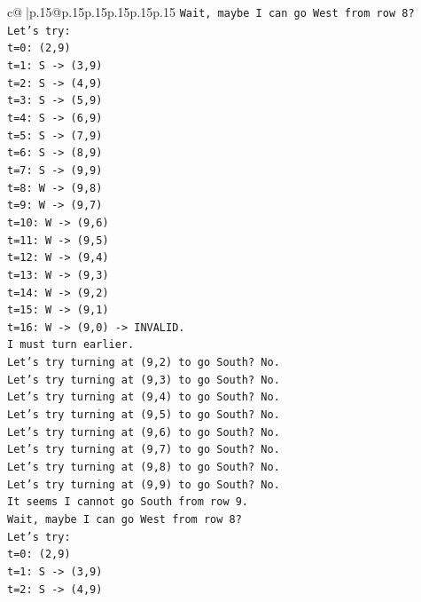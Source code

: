 \documentclass{article}
\begin{document}
{\begin{supertabular}{c@{$\;$}|p{.15\linewidth}@{}p{.15\linewidth}p{.15\linewidth}p{.15\linewidth}p{.15\linewidth}p{.15\linewidth}}
{{{\texttt{Wait, maybe I can go West from row 8?} \\
\texttt{Let's try:} \\
\texttt{t=0: (2,9)} \\
\texttt{t=1: S {-}> (3,9)} \\
\texttt{t=2: S {-}> (4,9)} \\
\texttt{t=3: S {-}> (5,9)} \\
\texttt{t=4: S {-}> (6,9)} \\
\texttt{t=5: S {-}> (7,9)} \\
\texttt{t=6: S {-}> (8,9)} \\
\texttt{t=7: S {-}> (9,9)} \\
\texttt{t=8: W {-}> (9,8)} \\
\texttt{t=9: W {-}> (9,7)} \\
\texttt{t=10: W {-}> (9,6)} \\
\texttt{t=11: W {-}> (9,5)} \\
\texttt{t=12: W {-}> (9,4)} \\
\texttt{t=13: W {-}> (9,3)} \\
\texttt{t=14: W {-}> (9,2)} \\
\texttt{t=15: W {-}> (9,1)} \\
\texttt{t=16: W {-}> (9,0) {-}> INVALID.} \\
\texttt{I must turn earlier.} \\
\texttt{Let's try turning at (9,2) to go South? No.} \\
\texttt{Let's try turning at (9,3) to go South? No.} \\
\texttt{Let's try turning at (9,4) to go South? No.} \\
\texttt{Let's try turning at (9,5) to go South? No.} \\
\texttt{Let's try turning at (9,6) to go South? No.} \\
\texttt{Let's try turning at (9,7) to go South? No.} \\
\texttt{Let's try turning at (9,8) to go South? No.} \\
\texttt{Let's try turning at (9,9) to go South? No.} \\
\texttt{It seems I cannot go South from row 9.} \\
\texttt{Wait, maybe I can go West from row 8?} \\
\texttt{Let's try:} \\
\texttt{t=0: (2,9)} \\
\texttt{t=1: S {-}> (3,9)} \\
\texttt{t=2: S {-}> (4,9)} \\
}}}
\end{supertabular}}
\end{document}
